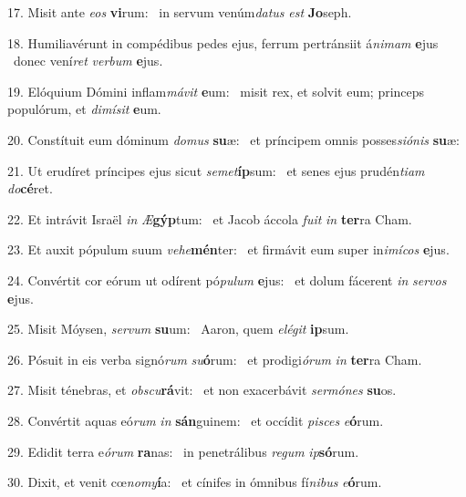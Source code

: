 17. Misit ante \textit{e}\textit{os} \textbf{vi}rum: \ast\  in servum venúm\textit{da}\textit{tus} \textit{est} \textbf{Jo}seph.\

18. Humiliavérunt in compédibus pedes ejus, ferrum pertránsiit á\textit{ni}\textit{mam} \textbf{e}jus \ast\  donec vení\textit{ret} \textit{ver}\textit{bum} \textbf{e}jus.\

19. Elóquium Dómini inflam\textit{má}\textit{vit} \textbf{e}um: \ast\  misit rex, et solvit eum; princeps populórum, et \textit{di}\textit{mí}\textit{sit} \textbf{e}um.\

20. Constítuit eum dóminum \textit{do}\textit{mus} \textbf{su}æ: \ast\  et príncipem omnis posses\textit{si}\textit{ó}\textit{nis} \textbf{su}æ:\

21. Ut erudíret príncipes ejus sicut \textit{se}\textit{met}\textbf{íp}sum: \ast\  et senes ejus prudén\textit{ti}\textit{am} \textit{do}\textbf{cé}ret.\

22. Et intrávit Israël \textit{in} \textit{Æ}\textbf{gýp}tum: \ast\  et Jacob áccola \textit{fu}\textit{it} \textit{in} \textbf{ter}ra Cham.\

23. Et auxit pópulum suum \textit{ve}\textit{he}\textbf{mén}ter: \ast\  et firmávit eum super in\textit{i}\textit{mí}\textit{cos} \textbf{e}jus.\

24. Convértit cor eórum ut odírent pó\textit{pu}\textit{lum} \textbf{e}jus: \ast\  et dolum fácerent \textit{in} \textit{ser}\textit{vos} \textbf{e}jus.\

25. Misit Móysen, \textit{ser}\textit{vum} \textbf{su}um: \ast\  Aaron, quem \textit{e}\textit{lé}\textit{git} \textbf{ip}sum.\

26. Pósuit in eis verba signó\textit{rum} \textit{su}\textbf{ó}rum: \ast\  et prodigi\textit{ó}\textit{rum} \textit{in} \textbf{ter}ra Cham.\

27. Misit ténebras, et \textit{obs}\textit{cu}\textbf{rá}vit: \ast\  et non exacerbávit \textit{ser}\textit{mó}\textit{nes} \textbf{su}os.\

28. Convértit aquas eó\textit{rum} \textit{in} \textbf{sán}guinem: \ast\  et occídit \textit{pi}\textit{sces} \textit{e}\textbf{ó}rum.\

29. Edidit terra e\textit{ó}\textit{rum} \textbf{ra}nas: \ast\  in penetrálibus \textit{re}\textit{gum} \textit{ip}\textbf{só}rum.\

30. Dixit, et venit cœ\textit{no}\textit{my}\textbf{í}a: \ast\  et cínifes in ómnibus fí\textit{ni}\textit{bus} \textit{e}\textbf{ó}rum.\

